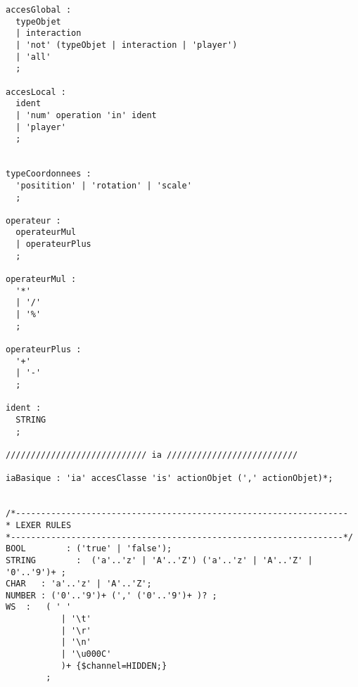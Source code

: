 \begin{lstlisting}[language=GameGrammar]
accesGlobal :
  typeObjet
  | interaction
  | 'not' (typeObjet | interaction | 'player')
  | 'all'
  ;
 
accesLocal :
  ident
  | 'num' operation 'in' ident
  | 'player'
  ;
 
 
typeCoordonnees :
  'positition' | 'rotation' | 'scale'
  ;
 
operateur :
  operateurMul
  | operateurPlus
  ;
  
operateurMul :
  '*'
  | '/'
  | '%'
  ;
  
operateurPlus :
  '+'
  | '-'
  ;
 
ident :
  STRING
  ;
 
//////////////////////////// ia //////////////////////////
 
iaBasique : 'ia' accesClasse 'is' actionObjet (',' actionObjet)*;
 

/*------------------------------------------------------------------
* LEXER RULES
*------------------------------------------------------------------*/
BOOL        : ('true' | 'false');
STRING        :  ('a'..'z' | 'A'..'Z') ('a'..'z' | 'A'..'Z' | '0'..'9')+ ;
CHAR   : 'a'..'z' | 'A'..'Z';
NUMBER : ('0'..'9')+ (',' ('0'..'9')+ )? ;
WS  :   ( ' '  
           | '\t'  
           | '\r'  
           | '\n'  
           | '\u000C'
           )+ {$channel=HIDDEN;}  
        ;
\end{lstlisting}
